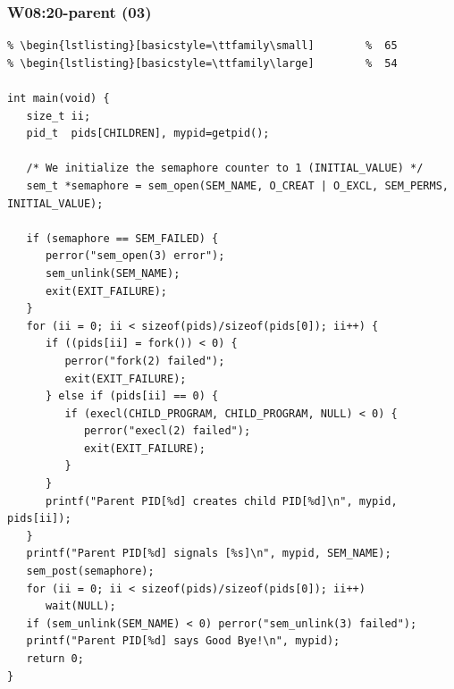 \documentclass[aspectratio=169, xcolor=table, notheorems, hyperref={pdfpagelabels=false}]{beamer}
\begin{document}
\begin{frame}[fragile]
\frametitle{W08:20-parent (03)}
\begin{lstlisting}[basicstyle=\ttfamily\tiny]         % 108
% \begin{lstlisting}[basicstyle=\ttfamily\footnotesize] %  72
% \begin{lstlisting}[basicstyle=\ttfamily\small]        %  65
% \begin{lstlisting}[basicstyle=\ttfamily\large]        %  54

int main(void) {
   size_t ii;
   pid_t  pids[CHILDREN], mypid=getpid();

   /* We initialize the semaphore counter to 1 (INITIAL_VALUE) */
   sem_t *semaphore = sem_open(SEM_NAME, O_CREAT | O_EXCL, SEM_PERMS, INITIAL_VALUE);

   if (semaphore == SEM_FAILED) {
      perror("sem_open(3) error");
      sem_unlink(SEM_NAME); 
      exit(EXIT_FAILURE);
   }
   for (ii = 0; ii < sizeof(pids)/sizeof(pids[0]); ii++) {
      if ((pids[ii] = fork()) < 0) {
         perror("fork(2) failed");
         exit(EXIT_FAILURE);
      } else if (pids[ii] == 0) {
         if (execl(CHILD_PROGRAM, CHILD_PROGRAM, NULL) < 0) {
            perror("execl(2) failed");
            exit(EXIT_FAILURE);
         }
      }
      printf("Parent PID[%d] creates child PID[%d]\n", mypid, pids[ii]);
   }
   printf("Parent PID[%d] signals [%s]\n", mypid, SEM_NAME);
   sem_post(semaphore);
   for (ii = 0; ii < sizeof(pids)/sizeof(pids[0]); ii++)
      wait(NULL);
   if (sem_unlink(SEM_NAME) < 0) perror("sem_unlink(3) failed");
   printf("Parent PID[%d] says Good Bye!\n", mypid);
   return 0;
}

\end{lstlisting}
\end{frame}
\end{document}

